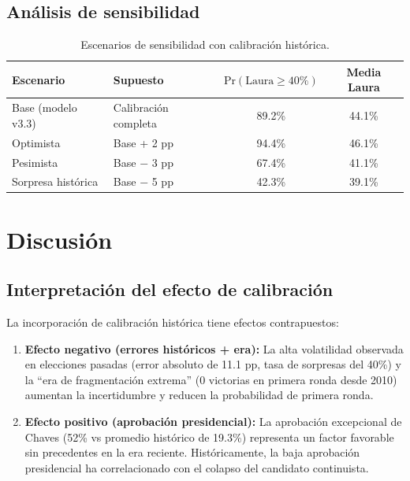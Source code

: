 \documentclass[11pt,a4paper]{article}
\newcommand{\prob}[1]{\text{Pr}(#1)}
\begin{document}
\subsection{Análisis de sensibilidad}

\begin{table}[H]
\centering
\caption{Escenarios de sensibilidad con calibración histórica.}
\label{tab:sensibilidad}
\begin{tabular}{@{}llcc@{}}
\toprule
\textbf{Escenario} & \textbf{Supuesto} & $\prob{\text{Laura} \geq 40\%}$ & \textbf{Media Laura} \\
\midrule
Base (modelo v3.3) & Calibración completa & 89.2\% & 44.1\% \\
Optimista & Base + 2 pp & 94.4\% & 46.1\% \\
Pesimista & Base $-$ 3 pp & 67.4\% & 41.1\% \\
Sorpresa histórica & Base $-$ 5 pp & 42.3\% & 39.1\% \\
\bottomrule
\end{tabular}
\end{table}

\section{Discusión}

\subsection{Interpretación del efecto de calibración}

La incorporación de calibración histórica tiene efectos contrapuestos:

\begin{enumerate}
    \item \textbf{Efecto negativo (errores históricos + era):} La alta volatilidad observada en elecciones pasadas (error absoluto de 11.1 pp, tasa de sorpresas del 40\%) y la ``era de fragmentación extrema'' (0 victorias en primera ronda desde 2010) aumentan la incertidumbre y reducen la probabilidad de primera ronda.
    
    \item \textbf{Efecto positivo (aprobación presidencial):} La aprobación excepcional de Chaves (52\% vs promedio histórico de 19.3\%) representa un factor favorable sin precedentes en la era reciente. Históricamente, la baja aprobación presidencial ha correlacionado con el colapso del candidato continuista.
\end{enumerate}
\end{document}
